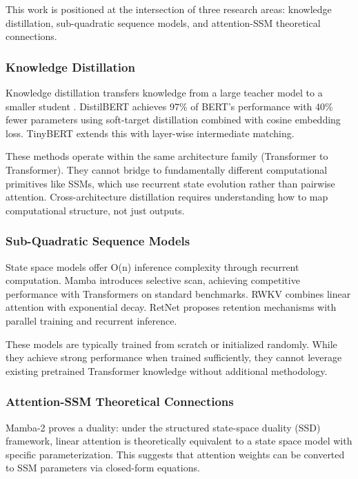 
This work is positioned at the intersection of three research areas: knowledge distillation, sub-quadratic sequence models, and attention-SSM theoretical connections.

\subsubsection{Knowledge Distillation}

Knowledge distillation transfers knowledge from a large teacher model to a smaller student \citep{hinton2015distilling}. DistilBERT \citep{sanh2019distilbert} achieves 97\% of BERT's performance with 40\% fewer parameters using soft-target distillation combined with cosine embedding loss. TinyBERT \citep{jiao2020tinybert} extends this with layer-wise intermediate matching.

These methods operate within the same architecture family (Transformer to Transformer). They cannot bridge to fundamentally different computational primitives like SSMs, which use recurrent state evolution rather than pairwise attention. Cross-architecture distillation requires understanding how to map computational structure, not just outputs.

\subsubsection{Sub-Quadratic Sequence Models}

State space models offer O(n) inference complexity through recurrent computation. Mamba \citep{gu2023mamba} introduces selective scan, achieving competitive performance with Transformers on standard benchmarks. RWKV \citep{peng2023rwkv} combines linear attention with exponential decay. RetNet \citep{sun2023retnet} proposes retention mechanisms with parallel training and recurrent inference.

These models are typically trained from scratch or initialized randomly. While they achieve strong performance when trained sufficiently, they cannot leverage existing pretrained Transformer knowledge without additional methodology.

\subsubsection{Attention-SSM Theoretical Connections}

Mamba-2 \citep{dao2024mamba2} proves a duality: under the structured state-space duality (SSD) framework, linear attention is theoretically equivalent to a state space model with specific parameterization. This suggests that attention weights can be converted to SSM parameters via closed-form equations.

